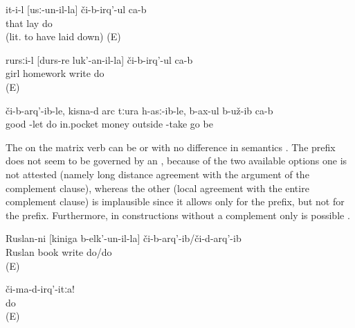 \begin{exe}

	\ex	\label{ex:‎‎‎He pretends to sleep (lit. to have laid down)}
	\gll	it-i-l	[usː-un-il-la]	či-b-irq'-ul	ca-b\\
		that	lay	do	\\
	\glt	{} (lit. to have laid down) (E)
	
	\ex	\label{ex:‎‎‎The girl pretends to make the homework}
	\gll	rursːi-l	[durs-re	luk'-an-il-la]	či-b-irq'-ul	ca-b\\
		girl	homework	write	do	\\
	\glt	{} (E)


	\ex	\label{ex:‎‎‎Apparently they pretended to make him to put him (to bed) well, took the money that was in his pocket and left}
		či-b-arq'-ib-le,	kisna-d	arc	tːura	h-asː-ib-le, b-ax-ul	b-už-ib	ca-b\\
		good	-let	do		in.pocket	money	outside	-take	\tsc{hpl-}go	be		\\
	\glt	{}
\end{exe}

The  on the matrix verb can be  or  with no difference in semantics . The prefix does not seem to be governed by an , because of the two available options one is not attested (namely long distance agreement with the  argument of the complement clause), whereas the other (local agreement with the entire complement clause) is implausible since it allows only for the  prefix, but not for the  prefix. Furthermore, in constructions without a complement only  is possible .
%
\begin{exe}
	\ex	\label{ex:‎‎‎Ruslan pretended to write a book}
	\gll	Ruslan-ni	[kiniga	b-elk'-un-il-la]	či-b-arq'-ib/či-d-arq'-ib\\
		Ruslan	book	write	do\slash{}do\\
	\glt	{} (E)

	\ex	\label{ex:‎Do not pretend}
	\gll	či-ma-d-irq'-itːa!\\
		do\\
	\glt	{} (E)
\end{exe}



